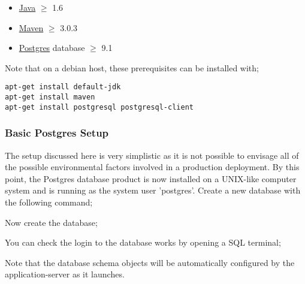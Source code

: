 \begin{itemize}
\item \href{https://community.java.net/open-jdk}{Java} $\geqslant$ 1.6
\item \href{http://maven.apache.org}{Maven} $\geqslant$ 3.0.3
\item \href{http://www.postgres.org}{Postgres} database $\geqslant$ 9.1
\end{itemize}

Note that on a debian host, these prerequisites can be installed with;

\begin{verbatim}
apt-get install default-jdk
apt-get install maven
apt-get install postgresql postgresql-client
\end{verbatim}

\subsubsection{Basic Postgres Setup}

The setup discussed here is very simplistic as it is not possible to envisage all of the possible environmental factors involved in a production deployment.  By this point, the Postgres database product is now installed on a UNIX-like computer system and is running as the system user 'postgres'.  Create a new database with the following command;


Now create the database;


You can check the login to the database works by opening a SQL terminal;


Note that the database schema objects will be automatically configured by the application-server as it launches.


